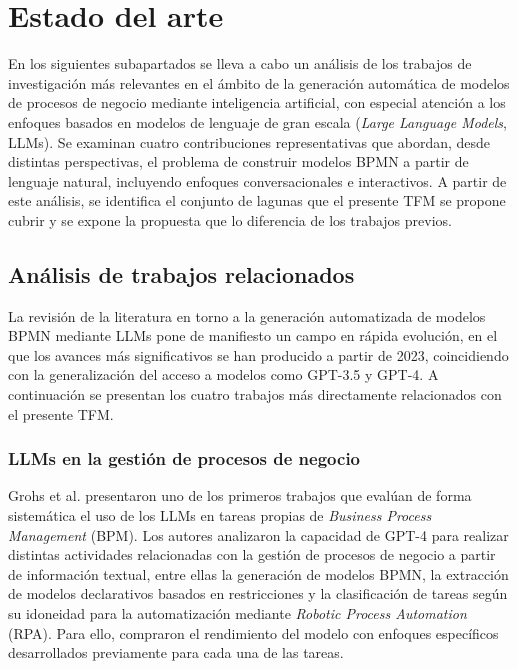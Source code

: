 

\chapter{Estado del arte}

En los siguientes subapartados se lleva a cabo un análisis de los trabajos de investigación más relevantes en el ámbito de la generación automática de modelos de procesos de negocio mediante inteligencia artificial, con especial atención a los enfoques basados en modelos de lenguaje de gran escala (\textit{Large Language Models}, LLMs). Se examinan cuatro contribuciones representativas que abordan, desde distintas perspectivas, el problema de construir modelos BPMN a partir de lenguaje natural, incluyendo enfoques conversacionales e interactivos. A partir de este análisis, se identifica el conjunto de lagunas que el presente TFM se propone cubrir y se expone la propuesta que lo diferencia de los trabajos previos.

\section{Análisis de trabajos relacionados}

La revisión de la literatura en torno a la generación automatizada de modelos BPMN mediante LLMs pone de manifiesto un campo en rápida evolución, en el que los avances más significativos se han producido a partir de 2023, coincidiendo con la generalización del acceso a modelos como GPT-3.5 y GPT-4. A continuación se presentan los cuatro trabajos más directamente relacionados con el presente TFM.

\subsection{LLMs en la gestión de procesos de negocio}

Grohs et al. \cite{klievtsova2023} presentaron uno de los primeros trabajos que evalúan de forma sistemática el uso 
de los LLMs en tareas propias de \textit{Business Process Management} (BPM). Los autores analizaron la capacidad de GPT-4 
para realizar distintas actividades relacionadas con la gestión de procesos de negocio a partir de información textual, 
entre ellas la generación de modelos BPMN, la extracción de modelos declarativos basados en restricciones 
y la clasificación de tareas según su idoneidad para la automatización mediante \textit{Robotic Process Automation} (RPA). Para ello, compraron el rendimiento 
del modelo con enfoques específicos desarrollados previamente para cada una de las tareas.




